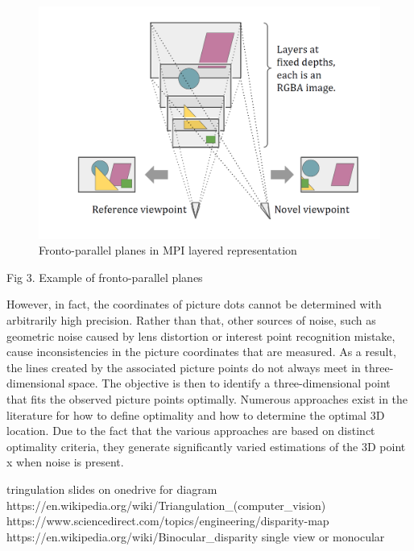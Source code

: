 \begin{figure}[!h]
    \includegraphics[width=1\columnwidth]{figures/mpi-layered-representation.png}
    \caption{Fronto-parallel planes in MPI layered representation}
    \label{fig:mpi-layered-representation}
\end{figure}
Fig 3. Example of fronto-parallel planes

However, in fact, the coordinates of picture dots cannot be determined with arbitrarily high precision. Rather than that, other sources of noise, such as geometric noise caused by lens distortion or interest point recognition mistake, cause inconsistencies in the picture coordinates that are measured. As a result, the lines created by the associated picture points do not always meet in three-dimensional space. The objective is then to identify a three-dimensional point that fits the observed picture points optimally. Numerous approaches exist in the literature for how to define optimality and how to determine the optimal 3D location. Due to the fact that the various approaches are based on distinct optimality criteria, they generate significantly varied estimations of the 3D point x when noise is present.

tringulation slides on onedrive for diagram
https://en.wikipedia.org/wiki/Triangulation_(computer_vision)
https://www.sciencedirect.com/topics/engineering/disparity-map
https://en.wikipedia.org/wiki/Binocular_disparity
single view or monocular